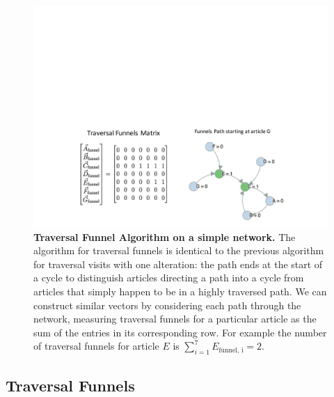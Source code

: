 \documentclass[pre,twocolumn,twoside,superscriptaddress,floatfix]{revtex4-1}
\begin{document}
{\begin{figure}[tp!]
  \includegraphics[width=\columnwidth]{fig003_traversal_funnel_algo_figure.pdf}
  \caption{
    \textbf{Traversal Funnel Algorithm on a simple network.}
  The algorithm for traversal funnels is identical to the previous algorithm for traversal visits with one alteration: the path ends at the start of a cycle to distinguish articles directing a path into a cycle from articles that simply happen to be in a highly traversed path. We can construct similar vectors by considering each path through the network, measuring traversal funnels for a particular article as the sum of the entries in its corresponding row. For example
  the number of traversal funnels for article $E$ is 
  $\sum_{i=1}^7 E_{\text{funnel, i}} = 2$.}
  \label{fig:Traversal Funnels}

\end{figure}
\subsection{Traversal Funnels}
\label{Traversal Funnels}

}
\end{document}
